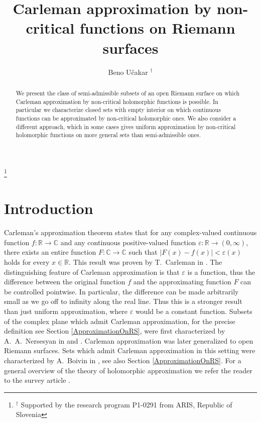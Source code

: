 \documentclass[a4paper,11pt]{amsart}
\newcommand{\R}{\mathbb R}
\newcommand{\C}{\mathbb C}
\newcommand{\abs}[1]{\left|#1\right|}
\begin{document}
\title{Carleman approximation by non-critical functions on Riemann surfaces}
\author[B. U\v{c}akar]{Beno U\v{c}akar $^{\dag}$}
\address{B. U\v{c}akar: Institute for Mathematics, Physics and Mechanics and Faculty of Mathematics and Physics, University of Ljubljana, Jadranska 19, 1000 Ljubljana, Slovenia}
\thanks{$^{\dag}$  Supported by the research program P1-0291 from ARIS, Republic of Slovenia}
\date{}

\begin{abstract}
    We present the class of semi-admissible subsets of an open Riemann surface on which Carleman approximation by non-critical holomorphic functions is possible.
    In particular we characterize closed sets with empty interior on which continuous functions can be approximated by non-critical holomorphic ones. 
    We also consider a different approach, which in some cases gives uniform approximation by non-critical holomorphic functions on more general sets than semi-admissible ones.
\end{abstract}

\maketitle

\section{Introduction} \label{introduction}

Carleman's approximation theorem states that for any complex-valued continuous function $f \colon \R \to \C$ 
and any continuous positive-valued function $\varepsilon \colon \R \to (0,\infty)$, there exists an entire function $F \colon \C \to \C$ such that $\abs{F(x)-f(x)} < \varepsilon(x)$ holds for every $x \in \R$.
This result was proven by T.~Carleman in \cite{OGCarleman}. 
The distinguishing feature of Carleman approximation is that $\varepsilon$ is a function, 
thus the difference between the original function $f$ and the approximating function $F$ can be controlled pointwise. 
In particular, the difference can be made arbitrarily small as we go off to infinity along the real line.
Thus this is a stronger result than just uniform approximation, where $\varepsilon$ would be a constant function.
Subsets of the complex plane which admit Carleman approximation, for the precise definition see Section \ref{ApproximationOnRS}, were first characterized by A.~A.~Nersesyan in \cite{Nersesyan1} and \cite{Nersesyan2}.
Carleman approximation was later generalized to open Riemann surfaces. Sets which admit Carleman approximation in this setting were characterized by A.~Boivin in \cite{Boivin1986}, see also Section \ref{ApproximationOnRS}.
For a general overview of the theory of holomorphic approximation we refer the reader to the survey article \cite{LegacyOfWeirstrass}.
 
\end{document}
